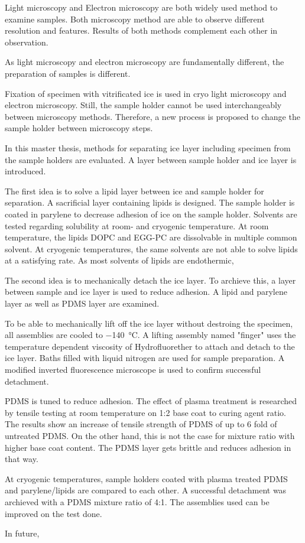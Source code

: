 Light microscopy and Electron microscopy are both widely used method to examine samples. Both microscopy method are able to observe different resolution and features. Results of both methods complement each other in observation.

As light microscopy and electron microscopy are fundamentally different, the preparation of samples is different. 

Fixation of specimen with vitrificated ice is used in cryo light microscopy and electron microscopy. Still, the sample holder cannot be used interchangeably between microscopy methods. Therefore, a new process is proposed to change the sample holder between microscopy steps.

In this master thesis, methods for separating ice layer including specimen from the sample holders are evaluated. A layer between sample holder and ice layer is introduced. 

The first idea is to solve a lipid layer between ice and sample holder for separation. A sacrificial layer containing lipids is designed. The sample holder is coated in parylene to decrease adhesion of ice on the sample holder. Solvents are tested regarding solubility at room- and cryogenic temperature. At room temperature, the lipids DOPC and EGG-PC are dissolvable in multiple common solvent. At cryogenic temperatures, the same solvents are not able to solve lipids at a satisfying rate. As most solvents of lipids are endothermic, %

The second idea is to mechanically detach the ice layer. To archieve this, a layer between sample and ice layer is used to reduce adhesion. A lipid and parylene layer as well as PDMS layer are examined. 

To be able to mechanically lift off the ice layer without destroing the specimen, all assemblies are cooled to \SI{-140}{\degreeCelsius}. A lifting assembly named "finger" uses the temperature dependent viscosity of Hydrofluorether to attach and detach to the ice layer. Baths filled with liquid nitrogen are used for sample preparation. A modified inverted fluorescence microscope is used to confirm successful detachment.

PDMS is tuned to reduce adhesion. The effect of plasma treatment is researched by tensile testing at room temperature on 1:2 base coat to curing agent ratio. The results show an increase of tensile strength of PDMS of up to 6 fold of untreated PDMS. On the other hand, this is not the case for mixture ratio with higher base coat content. The PDMS layer gets brittle and reduces adhesion in that way.

At cryogenic temperatures, sample holders coated with plasma treated PDMS and parylene/lipids are compared to each other. A successful detachment was archieved with a PDMS mixture ratio of 4:1. The assemblies used can be improved on the test done. 

In future, %